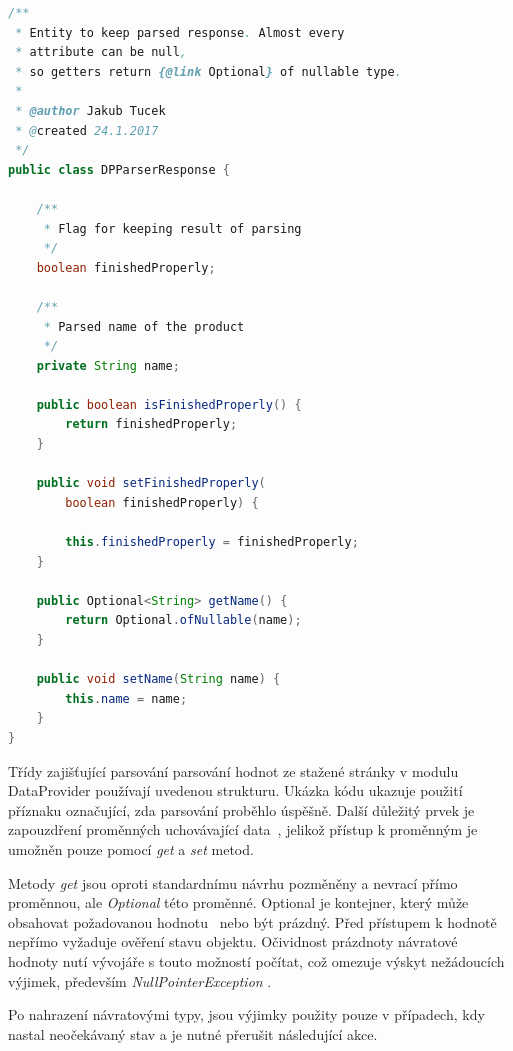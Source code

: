 \documentclass[thesis=B,czech]{FITthesis}[2012/06/26]
\begin{document}
\begin{lstlisting}[language=Java]
/**
 * Entity to keep parsed response. Almost every 
 * attribute can be null, 
 * so getters return {@link Optional} of nullable type.
 *
 * @author Jakub Tucek
 * @created 24.1.2017
 */
public class DPParserResponse {

    /**
     * Flag for keeping result of parsing
     */
    boolean finishedProperly;

    /**
     * Parsed name of the product
     */
    private String name;

    public boolean isFinishedProperly() {
        return finishedProperly;
    }

    public void setFinishedProperly(
    	boolean finishedProperly) {
    	
        this.finishedProperly = finishedProperly;
    }

    public Optional<String> getName() {
        return Optional.ofNullable(name);
    }

    public void setName(String name) {
        this.name = name;
    }
}
\end{lstlisting}

Třídy zajišťující parsování parsování hodnot ze stažené stránky v modulu DataProvider používají uvedenou strukturu.
Ukázka kódu ukazuje použití příznaku označující, zda parsování proběhlo úspěšně. Další důležitý prvek
je zapouzdření proměnných uchovávající data~\cite{encapsulation}, jelikož přístup k proměnným je umožněn pouze pomocí \textit{get} a \textit{set} metod.
\par
Metody \textit{get} jsou oproti standardnímu návrhu pozměněny a nevrací přímo proměnnou, ale \textit{Optional} této proměnné.
Optional je kontejner, který může obsahovat požadovanou hodnotu~\cite{optional} nebo být prázdný. 
Před přístupem k hodnotě nepřímo vyžaduje ověření stavu objektu. Očividnost prázdnoty návratové hodnoty nutí vývojáře s touto možností počítat, což
omezuje výskyt nežádoucích výjimek, především \textit{NullPointerException} \cite{nullPointerException}.
\par
Po nahrazení návratovými typy, jsou výjimky použity pouze v případech, kdy nastal neočekávaný stav a je nutné přerušit následující akce.
\end{document}
